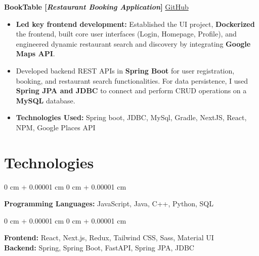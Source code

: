 \documentclass[10pt, letterpaper]{article}
\newenvironment{highlights}{
    \begin{itemize}[
        topsep=0.10 cm,     %
        parsep=0.10 cm,     %
        partopsep=0pt,      %
        itemsep=0pt,        %
        leftmargin=0 cm + 10pt  %
    ]
}{
    \end{itemize}
}
\newenvironment{onecolentry}{
    \begin{adjustwidth}{
        0 cm + 0.00001 cm
    }{
        0 cm + 0.00001 cm
    }
}{
    \end{adjustwidth}
}
\begin{document}
        \vspace{0.2 cm}

        \noindent
        \textbf{BookTable [\textit{Restaurant Booking Application}]} \hfill \href{https://github.com/gopinathsjsu/team-project-20201-synergy}{\small \faGithub \space GitHub}
        
        \begin{highlights}
            \item \textbf{Led key frontend development:} Established the UI project, \textbf{Dockerized} the frontend, built core user interfaces (Login, Homepage, Profile), and engineered dynamic restaurant search and discovery by integrating \textbf{Google Maps API}.
            \item Developed backend REST APIs in \textbf{Spring Boot} for user registration, booking, and restaurant search functionalities. For data persistence, I used \textbf{Spring JPA and JDBC} to connect and perform CRUD operations on a \textbf{MySQL} database.
            \item \textbf{Technologies Used:} Spring boot, JDBC, MySql, Gradle, NextJS, React, NPM, Google Places API
        \end{highlights}



    
    \section{Technologies}

        \begin{onecolentry}
        \textbf{Programming Languages:} JavaScript, Java, C++, Python, SQL  %
        \end{onecolentry}
        
        \vspace{0.1 cm}
        
        \begin{onecolentry}
        \textbf{Frontend:} React, Next.js, Redux, Tailwind CSS, Sass, Material UI \\  %
        \vspace{0.1 cm}
        \textbf{Backend:} Spring, Spring Boot, FastAPI, Spring JPA, JDBC  %
        \end{onecolentry}
        
\end{document}
